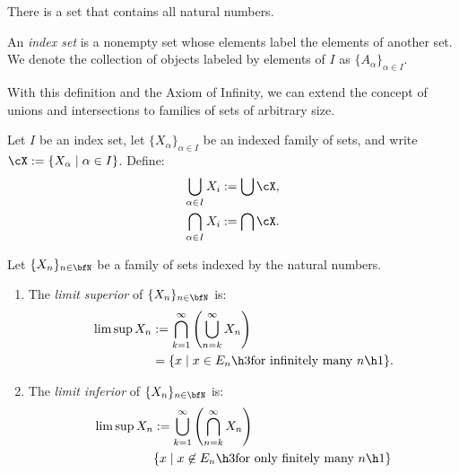    \begin{axiom}
        There is a set that contains all natural numbers.
    \end{axiom}

    \begin{definition}
        An \textit{index set} is a nonempty set whose elements label the elements of another set. We denote the collection of objects labeled by elements of $I$ as $\{A_\alpha\}_{\alpha \in I}$.
    \end{definition}

    With this definition and the Axiom of Infinity, we can extend the concept of unions and intersections to families of sets of arbitrary size.

    \begin{definition}
        Let $I$ be an index set, let $\{X_\alpha\}_{\alpha \in I}$ be an indexed family of sets, and write $\cX := \{X_\alpha \mid \alpha \in I\}$. Define:
            \begin{equation*}
            \begin{split}
                \bigcup_{\alpha \in I}X_i &:= \bigcup \cX, \\
                \bigcap_{\alpha \in I}X_i &:= \bigcap \cX.
            \end{split}
            \end{equation*}
    \end{definition}

    \begin{definition}
        Let $\{X_n\}_{n \in \bfN}$ be a family of sets indexed by the natural numbers.
        \begin{enumerate}[label = (\arabic*),itemsep=1pt,topsep=3pt]
            \item The \textit{limit superior} of $\{X_n\}_{n \in \bfN}$ is:
                \begin{equation*}
                \begin{split}
                    \limsup X_n 
                    & := \bigcap_{k = 1}^\infty \left( \bigcup_{n = k}^\infty X_n\right) \\
                    & = \{x \mid x \in E_n \h3\text{for infinitely many $n$}\h1\}. 
                \end{split}
                \end{equation*}
            \item The \textit{limit inferior} of $\{X_n\}_{n \in \bfN}$ is:
                \begin{equation*}
                \begin{split}
                    \limsup X_n 
                    & := \bigcup_{k = 1}^\infty \left( \bigcap_{n = k}^\infty X_n\right) \\
                    & \{x \mid x \not\in E_n \h3\text{for only finitely many $n$}\h1\}
                \end{split}
                \end{equation*}
        \end{enumerate}
    \end{definition}

